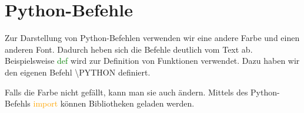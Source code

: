 \documentclass[12pt,a4paper]{scrbook}
\newcommand{\PYTHON}[1]{\textcolor{green}{\ttfamily #1}}
\begin{document}
\chapter{Python-Befehle}

Zur Darstellung von Python-Befehlen verwenden wir eine andere Farbe und einen anderen Font. 
Dadurch heben sich die Befehle deutlich vom Text ab. 
Beispielsweise \PYTHON{def} wird zur Definition von Funktionen verwendet. 
Dazu haben wir den eigenen Befehl {\ttfamily \textbackslash PYTHON} definiert.

\bigskip
\renewcommand{\PYTHON}[1]{\textcolor{orange}{\ttfamily #1}}

Falls die Farbe nicht gefällt, kann man sie auch ändern. 
Mittels des  Python-Befehls \PYTHON{import} können Bibliotheken geladen werden.
\end{document}

